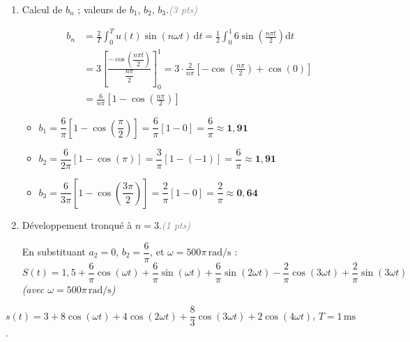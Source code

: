 \documentclass[a4paper,11pt]{article}
\newcommand{\dt}{\mathrm{d}t}
\newcommand{\reponse}[1]{%
  \begin{tcolorbox}[corrbox={}]
    #1
  \end{tcolorbox}%
}
\newcommand{\pts}[1]{\hfill\textcolor{gray}{\small\textit{(#1 pts)}}}
\begin{document}
\begin{enumerate}[label=\textbf{\arabic*.}, leftmargin=*, itemsep=0.4cm]
  \item Calcul de $b_n$ ; valeurs de $b_1$, $b_2$, $b_3$.\pts{3}

  \reponse{
    \begin{align*}
      b_n &= \frac{2}{T}\int_0^{T} u(t)\sin(n\omega t)\,\dt
           = \frac{1}{2}\int_0^{1} 6\sin\!\left(\frac{n\pi t}{2}\right)\dt \\[4pt]
          &= 3\left[\frac{-\cos\!\left(\dfrac{n\pi t}{2}\right)}{\dfrac{n\pi}{2}}\right]_0^{1}
           = 3\cdot\frac{2}{n\pi}\left[-\cos\!\left(\frac{n\pi}{2}\right)+\cos(0)\right] \\[6pt]
          &= \boxed{\frac{6}{n\pi}\left[1-\cos\!\left(\frac{n\pi}{2}\right)\right]}
    \end{align*}

    \medskip
    \begin{itemize}[leftmargin=1.5em, itemsep=2pt]
      \item $b_1 = \dfrac{6}{\pi}\left[1-\cos\!\left(\dfrac{\pi}{2}\right)\right]
                = \dfrac{6}{\pi}\left[1-0\right] = \dfrac{6}{\pi} \approx \mathbf{1{,}91}$

      \item $b_2 = \dfrac{6}{2\pi}\left[1-\cos(\pi)\right]
                = \dfrac{3}{\pi}\left[1-(-1)\right] = \dfrac{6}{\pi} \approx \mathbf{1{,}91}$

      \item $b_3 = \dfrac{6}{3\pi}\left[1-\cos\!\left(\dfrac{3\pi}{2}\right)\right]
                = \dfrac{2}{\pi}\left[1-0\right] = \dfrac{2}{\pi} \approx \mathbf{0{,}64}$
    \end{itemize}
  }

  \item Développement tronqué à $n = 3$.\pts{1}

  \reponse{
    En substituant $a_2 = 0$, $b_2 = \dfrac{6}{\pi}$, et $\omega = 500\pi\,\mathrm{rad/s}$ :
    \[
      S(t) = 1{,}5
           + \frac{6}{\pi}\cos(\omega t)
           + \frac{6}{\pi}\sin(\omega t)
           + \frac{6}{\pi}\sin(2\omega t)
           - \frac{2}{\pi}\cos(3\omega t)
           + \frac{2}{\pi}\sin(3\omega t)
    \]
    \textit{(avec $\omega = 500\pi\,\mathrm{rad/s}$)}
  }

\end{enumerate}

\newpage

\begin{tcolorbox}[exobox={Exercice 3 \hfill \normalfont\textit{(10 points)}}]
  $s(t) = 3 + 8\cos(\omega t) + 4\cos(2\omega t) + \dfrac{8}{3}\cos(3\omega t) + 2\cos(4\omega t)$,
  \quad $T = 1\,\mathrm{ms}$.
\end{tcolorbox}
\end{document}
